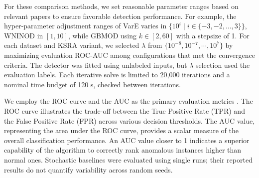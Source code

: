 \documentclass[ASNA,twocolumn]{USG} %
\begin{document}
For these comparison methods, we set reasonable parameter ranges based on relevant papers to ensure favorable detection performance. For example, the hyper-parameter adjustment ranges of VarE varies in $\{10^i \mid i \in \{-3, -2, \dots, 3\}\}$, WNINOD in $[1,10]$, while GBMOD using $k \in[2,60]$ with a stepsize of 1. For each dataset and KSRA variant, we selected $\lambda$ from $\{10^{-8}, 10^{-7},\cdots, 10^{7}\}$ by maximizing evaluation ROC-AUC among configurations that met the convergence criteria. The detector was fitted using unlabeled inputs, but $\lambda$ selection used the evaluation labels. Each iterative solve is limited to 20,000 iterations and a nominal time budget of 120 s, checked between iterations.

We employ the ROC curve and the AUC as the primary evaluation metrics \cite{campos2016evaluation}. The ROC curve illustrates the trade-off between the True Positive Rate (TPR) and the False Positive Rate (FPR) across various decision thresholds. The AUC value, representing the area under the ROC curve, provides a scalar measure of the overall classification performance. An AUC value closer to 1 indicates a superior capability of the algorithm to correctly rank anomalous instances higher than normal ones. Stochastic baselines were evaluated using single runs; their reported results do not quantify variability across random seeds.
\end{document}
